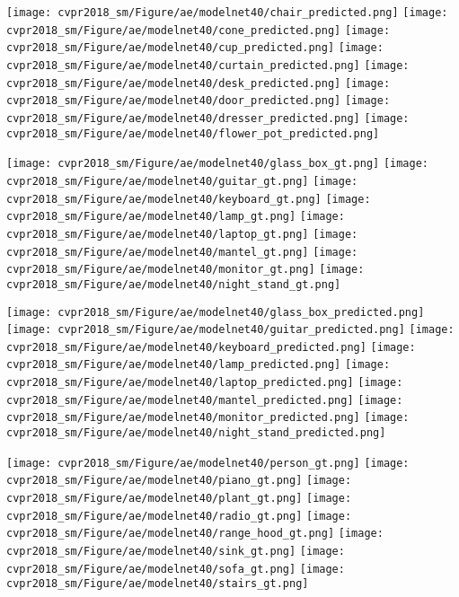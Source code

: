 \documentclass[10pt,twocolumn,letterpaper]{article}
\begin{document}
\begin{figure*}[t]
        \texttt{[image: cvpr2018\_sm/Figure/ae/modelnet40/chair\_predicted.png]}
        \texttt{[image: cvpr2018\_sm/Figure/ae/modelnet40/cone\_predicted.png]}
        \texttt{[image: cvpr2018\_sm/Figure/ae/modelnet40/cup\_predicted.png]}
        \texttt{[image: cvpr2018\_sm/Figure/ae/modelnet40/curtain\_predicted.png]}
        \texttt{[image: cvpr2018\_sm/Figure/ae/modelnet40/desk\_predicted.png]}
        \texttt{[image: cvpr2018\_sm/Figure/ae/modelnet40/door\_predicted.png]}
        \texttt{[image: cvpr2018\_sm/Figure/ae/modelnet40/dresser\_predicted.png]}
        \texttt{[image: cvpr2018\_sm/Figure/ae/modelnet40/flower\_pot\_predicted.png]}
        
        \texttt{[image: cvpr2018\_sm/Figure/ae/modelnet40/glass\_box\_gt.png]}
        \texttt{[image: cvpr2018\_sm/Figure/ae/modelnet40/guitar\_gt.png]}
        \texttt{[image: cvpr2018\_sm/Figure/ae/modelnet40/keyboard\_gt.png]}
        \texttt{[image: cvpr2018\_sm/Figure/ae/modelnet40/lamp\_gt.png]}
        \texttt{[image: cvpr2018\_sm/Figure/ae/modelnet40/laptop\_gt.png]}
        \texttt{[image: cvpr2018\_sm/Figure/ae/modelnet40/mantel\_gt.png]}
        \texttt{[image: cvpr2018\_sm/Figure/ae/modelnet40/monitor\_gt.png]}
        \texttt{[image: cvpr2018\_sm/Figure/ae/modelnet40/night\_stand\_gt.png]}
        
        \texttt{[image: cvpr2018\_sm/Figure/ae/modelnet40/glass\_box\_predicted.png]}
        \texttt{[image: cvpr2018\_sm/Figure/ae/modelnet40/guitar\_predicted.png]}
        \texttt{[image: cvpr2018\_sm/Figure/ae/modelnet40/keyboard\_predicted.png]}
        \texttt{[image: cvpr2018\_sm/Figure/ae/modelnet40/lamp\_predicted.png]}
        \texttt{[image: cvpr2018\_sm/Figure/ae/modelnet40/laptop\_predicted.png]}
        \texttt{[image: cvpr2018\_sm/Figure/ae/modelnet40/mantel\_predicted.png]}
        \texttt{[image: cvpr2018\_sm/Figure/ae/modelnet40/monitor\_predicted.png]}
        \texttt{[image: cvpr2018\_sm/Figure/ae/modelnet40/night\_stand\_predicted.png]}
        
        \texttt{[image: cvpr2018\_sm/Figure/ae/modelnet40/person\_gt.png]}
        \texttt{[image: cvpr2018\_sm/Figure/ae/modelnet40/piano\_gt.png]}
        \texttt{[image: cvpr2018\_sm/Figure/ae/modelnet40/plant\_gt.png]}
        \texttt{[image: cvpr2018\_sm/Figure/ae/modelnet40/radio\_gt.png]}
        \texttt{[image: cvpr2018\_sm/Figure/ae/modelnet40/range\_hood\_gt.png]}
        \texttt{[image: cvpr2018\_sm/Figure/ae/modelnet40/sink\_gt.png]}
        \texttt{[image: cvpr2018\_sm/Figure/ae/modelnet40/sofa\_gt.png]}
        \texttt{[image: cvpr2018\_sm/Figure/ae/modelnet40/stairs\_gt.png]}
        

\end{figure*}
\end{document}
